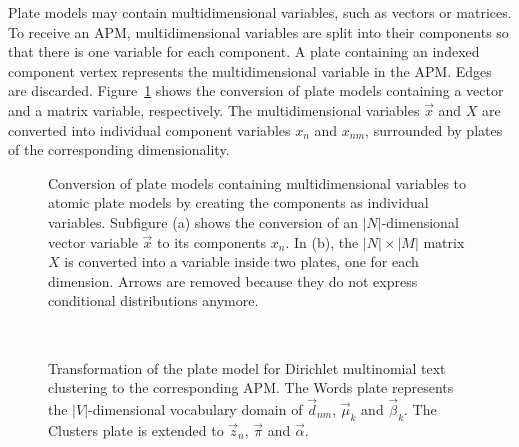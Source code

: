 Plate models may contain multidimensional variables, such as vectors or matrices. To receive an APM, multidimensional variables are split into their components so that there is one variable for each component. A plate containing an indexed component vertex represents the multidimensional variable in the APM. Edges are discarded. Figure~\ref{fig:pm2apm} shows the conversion of plate models containing a vector and a matrix variable, respectively. The multidimensional variables $\vec x$ and $X$ are converted into individual component variables $x_n$ and $x_{nm}$, surrounded by plates of the corresponding dimensionality.

\begin{figure}[p]
\centering
\scalebox{\tikzScale}{\adjustTikzSize }
\caption[Conversion of plate models to atomic plate models]{Conversion of plate models containing multidimensional variables to atomic plate models by creating the components as individual variables. Subfigure (a) shows the conversion of an $|N|$-dimensional vector variable $\vec x$ to its components $x_n$. In (b), the $|N| \times |M|$ matrix $X$ is converted into a variable inside two plates, one for each dimension. Arrows are removed because they do not express conditional distributions anymore.}\label{fig:pm2apm}
\end{figure}

\begin{figure}[p]
\begin{minipage}[t]{0.49\linewidth}
	\begin{center}
	\end{center}
\end{minipage}
\hspace{0.0cm}
\begin{minipage}[t]{0.49\linewidth}
	\begin{center}
	\end{center}
\end{minipage}\\
\caption[Dirichlet multinomial text clustering APM]{Transformation of the plate model for Dirichlet multinomial text clustering to the corresponding APM. The Words plate represents the $|V|$-dimensional vocabulary domain of $\vec d_{nm}$, $\vec \mu_k$ and $\vec \beta_k$. The Clusters plate is extended to $\vec z_n$, $\vec \pi$ and $\vec \alpha$.}
\label{fig:clustering_platemodels}
\end{figure}

